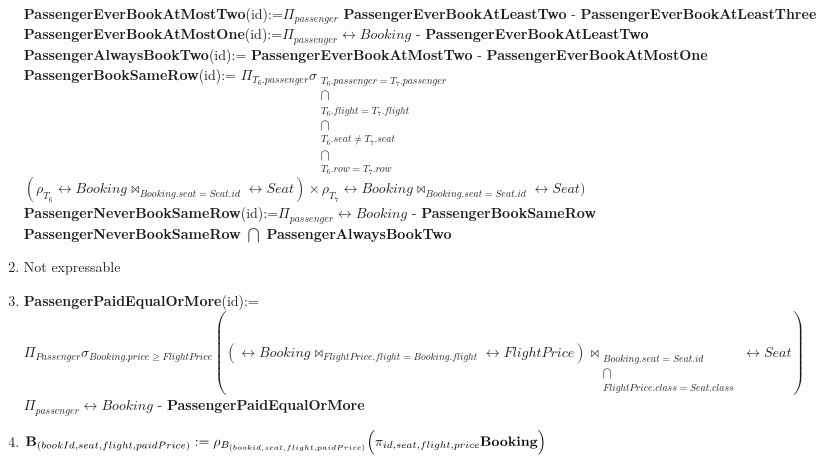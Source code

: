 \begin{enumerate}[label=\textbf{\arabic*.}]
\textbf{PassengerEverBookAtMostTwo}(id):=$\Pi_{passenger}$ \textbf{PassengerEverBookAtLeastTwo} - \textbf{PassengerEverBookAtLeastThree}\\

\textbf{PassengerEverBookAtMostOne}(id):=$\Pi_{passenger} \rel{Booking}$ - \textbf{PassengerEverBookAtLeastTwo}\\

\textbf{PassengerAlwaysBookTwo}(id):= \textbf{PassengerEverBookAtMostTwo} - \textbf{PassengerEverBookAtMostOne}\\

\textbf{PassengerBookSameRow}(id):= $\Pi_{T_6.passenger}\sigma_{\substack{T_6.passenger=T_7.passenger \\ \bigcap \\ T_6.flight = T_7.flight \\ \bigcap \\ T_6.seat \neq T_7.seat \\ \bigcap \\ T_6.row = T_7.row}}$ \\ $(\rho_{T_6} \rel{Booking}   \bowtie_{Booking.seat=Seat.id} \rel{Seat}) \times \rho_{T_7} \rel{Booking} \bowtie_{Booking.seat=Seat.id} \rel{Seat})$\\

\textbf{PassengerNeverBookSameRow}(id):=$\Pi_{passenger} \rel{Booking}$ - \textbf{PassengerBookSameRow}\\

\textbf{PassengerNeverBookSameRow} $\bigcap$ \textbf{PassengerAlwaysBookTwo}



\newpage
\item Not expressable

\item \textbf{PassengerPaidEqualOrMore}(id):=$\Pi_{Passenger} \sigma_{Booking.price \geq FlightPrice}((\rel{Booking} \bowtie_{FlightPrice.flight=Booking.flight} \rel{FlightPrice}) \bowtie_{\substack{Booking.seat=Seat.id \\ \bigcap \\ FlightPrice.class=Seat.class}} \rel{Seat})$\\

$\Pi_{passenger} \rel{Booking}$ - \textbf{PassengerPaidEqualOrMore}\\

\item

$\textbf{B}_{(bookId, seat, flight, paidPrice)} := \rho_{B_{(bookid, seat, flight, paidPrice)}} \Big( \pi_{id, seat, flight, price} \textbf{Booking} \Big)$\\


\end{enumerate}

